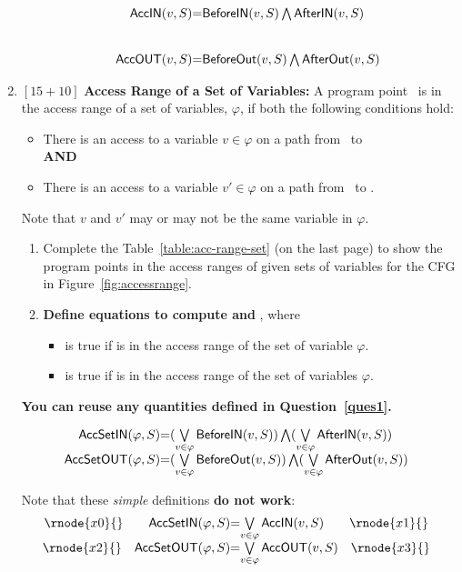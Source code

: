 \documentclass[12pt]{article}
\newcommand{\answer}[1]{{{\blue #1}}}
\begin{document}
\begin{enumerate}
\begin{enumerate}
{\[
\begin{array}{@{}r@{}c@{}l}
\inacc{v}{S} &=& \indef{v}{S} \bigwedge \inuse{v}{S} \\ \\ \\
\outacc{v}{S} &=& \outdef{v}{S} \bigwedge \outuse{v}{S}
\end{array}\]

}
\end{enumerate}
\clearpage
\newcommand{\vset}{\ensuremath{\varphi}}
\item $[15+10]$  {\bf Access Range of a Set of Variables:} A program point \pt\ is in the access range of a set of variables, \vset, if both the following conditions hold:
  \begin{itemize}
  \item  There is an access to a variable $v \in \vset$ on a path from \fgentry\ to \pt \\[5pt] {\bf AND}
  \item There is an access to a variable $v' \in \vset$ on a path from \pt\ to \fgexit. 
  \end{itemize}
Note that $v$ and $v'$ may or may not be the same variable in \vset.
\begin{enumerate}
\item Complete the Table~\ref{table:acc-range-set} (on the last
  page) to show the program points in the access ranges of given
  sets of variables for the CFG in Figure~\ref{fig:accessrange}.
\item {\bf Define equations to compute \inaccset{S}{\vset} and \outaccset{S}{\vset}}, where
\begin{itemize}
\item \inaccset{S}{\vset} is true if  is in the access range of the set of variable $\vset$.  
\item \outaccset{S}{\vset} is true if 
  is in the access range of the set of variables $\vset$.
\end{itemize}
\end{enumerate}
{\bf You can reuse any quantities defined in Question~\ref{ques1}.}
\answer{
\[
\begin{array}{@{}r@{}c@{}l}
\inaccset{\varphi}{S} &=& (\bigvee\limits_{v \in \varphi} \indef{v}{S}) \bigwedge (\bigvee\limits_{v \in \varphi} \inuse{v}{S}) \\
\outaccset{\varphi}{S} &=& (\bigvee\limits_{v \in \varphi} \outdef{v}{S}) \bigwedge (\bigvee\limits_{v \in \varphi} \outuse{v}{S}) 
\end{array}\]
{\color{red}
Note that these {\em simple} definitions {\bf do not work}:
\[\begin{array}{@{}r@{}c@{}l}
\rnode{x0}{}\qquad\inaccset{\varphi}{S}  &=& \bigvee\limits_{v \in \varphi}\inacc{v}{S}\qquad \rnode{x1}{}\\
\rnode{x2}{}\quad\outaccset{\varphi}{S} &=& \bigvee\limits_{v \in \varphi}\outacc{v}{S}\quad\rnode{x3}{}\\
\end{array}\]

}}
\end{enumerate}
\end{document}
